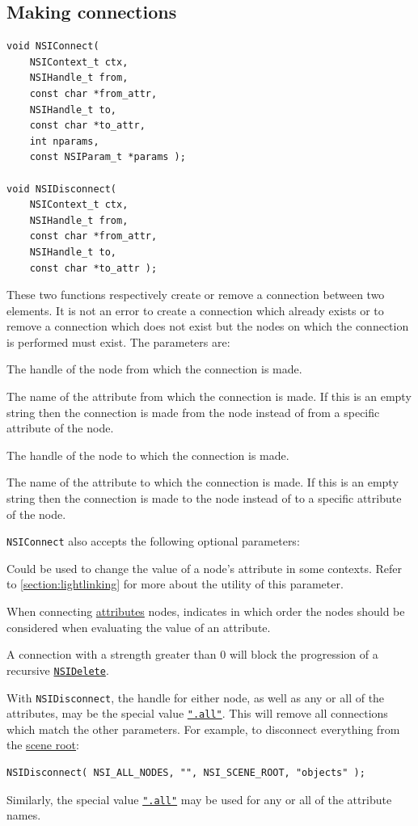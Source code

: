 \documentclass[oneside,ebook]{memoir}
\newcommand{\paramlistitemN}[1]{\item[#1]}
\newcommand{\paramlistitemTN}[2]{\item[#2\textcolor{lightgray}{\dotfill}#1]}
\newcommand{\paramlistitemTND}[3]{\paramlistitemTN{#1 {\rmfamily({\ttfamily#3})}}{#2}}
\begin{document}
\subsection{Making connections}
\label{CAPI:nsiconnect}\label{CAPI:nsidisconnect}
\begin{lstlisting}[style=CAPI]
void NSIConnect(
	NSIContext_t ctx,
	NSIHandle_t from,
	const char *from_attr,
	NSIHandle_t to,
	const char *to_attr,
	int nparams,
	const NSIParam_t *params );

void NSIDisconnect(
	NSIContext_t ctx,
	NSIHandle_t from,
	const char *from_attr,
	NSIHandle_t to,
	const char *to_attr );
\end{lstlisting}
These two functions respectively create or remove a connection between two elements. It is not an error to create a connection which already exists or to remove a connection which does not exist but the nodes on which the connection is performed must exist. The parameters are:
\begin{paramlist}
\paramlistitemN{from}
The handle of the node from which the connection is made.
\paramlistitemN{from\_attr}
The name of the attribute from which the connection is made. If this is an empty string then the connection is made from the node instead of from a specific attribute of the node.
\paramlistitemN{to}
The handle of the node to which the connection is made.
\paramlistitemN{to\_attr}
The name of the attribute to which the connection is made. If this is an empty string then the connection is made to the node instead of to a specific attribute of the node.
\end{paramlist}
\lstinline|NSIConnect| also accepts the following optional parameters:
\begin{paramlist}
\paramlistitemN{value}
Could be used to change the value of a node's attribute in some contexts.
Refer to \autoref{section:lightlinking} for more about the utility of this parameter.
\paramlistitemTND{int}{priority}{0}
When connecting \hyperref[section:attributesnode]{attributes} nodes, indicates in which order the nodes should be considered when evaluating the value of an attribute.
\paramlistitemTND{int}{strength}{0}
A connection with a strength greater than 0 will block the progression of a recursive \hyperref[CAPI:nsidelete]{\lstinline|NSIDelete|}.
\end{paramlist}
With \lstinline|NSIDisconnect|, the handle for either node, as well as any or all of the attributes, may be the special value \hyperref[NSI_ALL_NODES]{\lstinline|".all"|}.
This will remove all connections which match the other parameters. For example, to disconnect everything from the \hyperref[section:rootnode]{scene root}:
\begin{lstlisting}[style=CAPI]
NSIDisconnect( NSI_ALL_NODES, "", NSI_SCENE_ROOT, "objects" );
\end{lstlisting}
Similarly, the special value \hyperref[NSI_ALL_ATTRIBUTES]{\lstinline|".all"|} may be used for any or all of the attribute names.
\goodbreak
\end{document}
